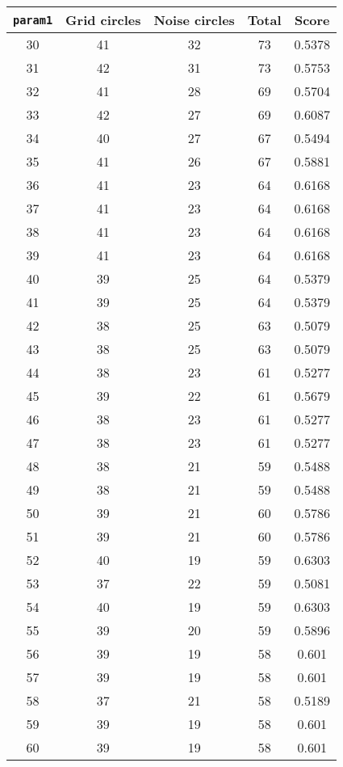 \documentclass[letterpaper, 12pt]{article}
\begin{document}
\begin{longtable}{|c|c|c|c|c|}
\hline
\textbf{\texttt{param1}} & \textbf{Grid circles} & \textbf{Noise circles} & \textbf{Total} & \textbf{Score} \\
\hline
30 & 41 & 32 & 73 & 0.5378 \\
\hline
31 & 42 & 31 & 73 & 0.5753 \\
\hline
32 & 41 & 28 & 69 & 0.5704 \\
\hline
33 & 42 & 27 & 69 & 0.6087 \\
\hline
34 & 40 & 27 & 67 & 0.5494 \\
\hline
35 & 41 & 26 & 67 & 0.5881 \\
\hline
36 & 41 & 23 & 64 & 0.6168 \\
\hline
37 & 41 & 23 & 64 & 0.6168 \\
\hline
38 & 41 & 23 & 64 & 0.6168 \\
\hline
39 & 41 & 23 & 64 & 0.6168 \\
\hline
40 & 39 & 25 & 64 & 0.5379 \\
\hline
41 & 39 & 25 & 64 & 0.5379 \\
\hline
42 & 38 & 25 & 63 & 0.5079 \\
\hline
43 & 38 & 25 & 63 & 0.5079 \\
\hline
44 & 38 & 23 & 61 & 0.5277 \\
\hline
45 & 39 & 22 & 61 & 0.5679 \\
\hline
46 & 38 & 23 & 61 & 0.5277 \\
\hline
47 & 38 & 23 & 61 & 0.5277 \\
\hline
48 & 38 & 21 & 59 & 0.5488 \\
\hline
49 & 38 & 21 & 59 & 0.5488 \\
\hline
50 & 39 & 21 & 60 & 0.5786 \\
\hline
51 & 39 & 21 & 60 & 0.5786 \\
\hline
52 & 40 & 19 & 59 & 0.6303 \\
\hline
53 & 37 & 22 & 59 & 0.5081 \\
\hline
54 & 40 & 19 & 59 & 0.6303 \\
\hline
55 & 39 & 20 & 59 & 0.5896 \\
\hline
56 & 39 & 19 & 58 & 0.601 \\
\hline
57 & 39 & 19 & 58 & 0.601 \\
\hline
58 & 37 & 21 & 58 & 0.5189 \\
\hline
59 & 39 & 19 & 58 & 0.601 \\
\hline
60 & 39 & 19 & 58 & 0.601 \\

\end{longtable}
\end{document}
